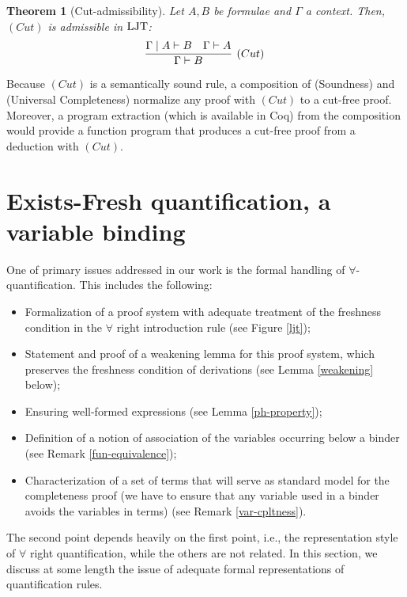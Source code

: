 \documentclass{svjour3}                     %
\newtheorem{thm}{Theorem}%
\newcommand{\Ga}{\Gamma}
\newcommand{\vd}{\vdash}
\newcommand{\ljt}{\textup{LJT}}
\begin{document}
\begin{thm}[Cut-admissibility]
  Let $A, B$ be formulae and $\Ga$ a context. Then, $(Cut)$ is admissible in $\ljt$:
  \begin{equation*}
    \vcenter{\infer[(Cut)]{\Ga \vd B}{\Ga \mid A \vd B & \Ga \vd A}}
  \end{equation*}
\end{thm}


Because $(Cut)$ is a semantically sound rule, a composition of (Soundness) and (Universal Completeness) normalize any proof with $(Cut)$ to a cut-free proof. Moreover, a program extraction (which is available in Coq) from the composition would provide a function program that produces a cut-free proof from a deduction with $(Cut)$.

\section{Exists-Fresh quantification, a variable binding}\label{three}
One of primary issues addressed in our work is the formal handling
 of $\forall$-quantification. This includes the following:
\begin{itemize}
\item Formalization of a proof system with adequate treatment of the freshness condition in the $\forall$ right introduction rule (see Figure \ref{ljt});

\item Statement and proof of a weakening lemma for this proof system, which preserves the freshness condition of derivations (see Lemma \ref{weakening} below);

\item Ensuring  well-formed expressions (see Lemma \ref{ph-property}); 

\item Definition of a notion of association of the variables occurring below a binder (see Remark \ref{fun-equivalence});

\item Characterization of a set of terms that will serve as standard model for the completeness proof (we have to ensure that any variable used in a binder avoids the variables in terms) (see Remark \ref{var-cpltness}).
\end{itemize}

The second point depends heavily on the first point, i.e., the representation style of $\forall$ right quantification, while the others are not related. In this section, we discuss at some length the issue of adequate formal representations of quantification rules.
\end{document}
